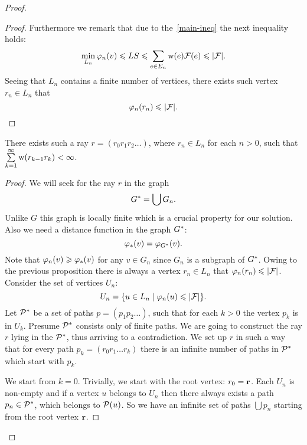 \documentclass[12pt]{amsart}
\begin{document}
\begin{proof}
\begin{proof}
        Furthermore we remark that due to the~\eqref{main-ineq} the next inequality holds:
        \[
          \min_{L_n} \phi_n(v) \leq LS \leq \sum_{e \in E_n} \wtp(e) \flowpos(e) \leq \lvert\flowpos\rvert.
        \]
        Seeing that $L_n$ contains a finite number of vertices, there exists such vertex $r_n \in L_n$ that
        \[
          \phi_n(r_n) \leq \lvert\flowpos\rvert.
        \]
      \end{proof}
      \begin{prop}
        There exists such a ray $r=(r_0 r_1 r_2\dots)$, where $r_n \in L_n$ for each $n > 0$, such that $\sum\limits_{k=1}^\infty \wtp(r_{k-1}r_k) < \infty$.
      \end{prop}
      \begin{proof}
        We will seek for the ray $r$ in the graph
        \[
          \gstar = \bigcup G_n.
        \]
        Unlike $G$ this graph is locally finite which is a crucial property for our solution.
        Also we need a distance function in the graph $\gstar$:
        \[
          \phistar(v)=\phi_{\gstar}(v).
        \]
        Note that $\phi_n(v) \geq \phistar(v)$ for any $v \in G_n$ since $G_n$ is a subgraph of $\gstar$.
        Owing to the previous proposition there is always a vertex $r_n \in L_n$ that $\phi_n(r_n) \leq \lvert\flowpos\rvert$.
        Consider the set of vertices $U_n$:
        \[
          U_n= \{u \in L_n \mid \phi_n(u) \leq \lvert\flowpos\rvert\}.
        \]
        Let $\cal{P}^*$ be a set of paths $p = (p_1 p_2 \dots)$, such that for each $k > 0$ the vertex $p_k$ is in $U_k$.
        Presume $\cal{P}^*$ consists only of finite paths.
        We are going to construct the ray $r$ lying in the $\cal{P}^*$, thus arriving to a contradiction.
        We set up $r$ in such a way that for every path $p_k= (r_0 r_1 \dots r_k)$ there is an infinite number of paths
          in $\cal{P}^*$ which start with $p_k$.

        We start from $k = 0$.
        Trivially, we start with the root vertex: $r_0 = \root$.
        Each $U_n$ is non-empty and if a vertex $u$ belongs to $U_n$ then there always exists
          a path $p_n \in \cal{P}^*$, which belongs to $\cal{P}(u)$.
        So we have an infinite set of paths $\bigcup p_n$ starting from the root vertex $\root$.


\end{proof}
\end{proof}
\end{document}
